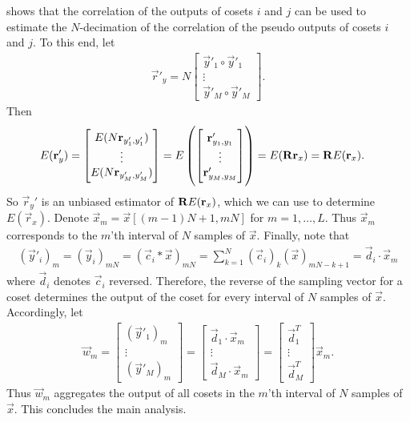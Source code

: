 \documentclass[a4paper, openany, oneside]{memoir}
\begin{document}
 shows that the correlation of the outputs of cosets $i$ and $j$ can be used to estimate the $N$-decimation of the correlation of the pseudo outputs of cosets $i$ and $j$. To this end, let
\begin{align*}
    \vec{r}'_y = N \begin{bmatrix}
        \vec{y}'_1 \circ \vec{y}'_1 \\
        \vdots \\
        \vec{y}'_M \circ \vec{y}'_M
    \end{bmatrix}.
\end{align*}
Then
\begin{align*}
    E(\boldsymbol{\mathbf{r}}'_y) &= \begin{bmatrix}
        E(N\boldsymbol{\mathbf{r}}_{y'_1,y'_1}) \\
        \vdots \\
        E(N\boldsymbol{\mathbf{r}}_{y'_M,y'_M})
    \end{bmatrix}
    = E\left(\begin{bmatrix}
        \boldsymbol{\mathbf{r}}'_{y_1,y_1} \\
        \vdots \\
        \boldsymbol{\mathbf{r}}'_{y_M,y_M} \\
    \end{bmatrix}\right) = E(\boldsymbol{\mathbf{R}} \boldsymbol{\mathbf{r}}_x) = \boldsymbol{\mathbf{R}} E(\boldsymbol{\mathbf{r}}_x).
\end{align*}
So $\vec{r}_y'$ is an unbiased estimator of $\boldsymbol{\mathbf{R}} E(\boldsymbol{\mathbf{r}}_x)$, which we can use to determine $E(\vec{r}_x)$. Denote $\vec{x}_m = \vec{x}[(m-1)N+1,mN]$ for $m = 1,\ldots,L$. Thus $\vec{x}_m$ corresponds to the $m$'th interval of $N$ samples of $\vec{x}$. Finally, note that
\begin{align*}
    (\vec{y}'_i)_m = (\vec{y}_i)_{mN} = (\vec{c}_i \ast \vec{x})_{mN} = \sum_{k=1}^N (\vec{c}_i)_k (\vec{x})_{mN - k + 1} = \vec{d}_i \cdot \vec{x}_m
\end{align*}
where $\vec{d}_i$ denotes $\vec{c}_i$ reversed. Therefore, the reverse of the sampling vector for a coset determines the output of the coset for every interval of $N$ samples of $\vec{x}$. Accordingly, let
\begin{align*}
    \vec{w}_m = \begin{bmatrix}
        (\vec{y}'_1)_m \\
        \vdots \\
        (\vec{y}'_M)_m
    \end{bmatrix} = \begin{bmatrix}
        \vec{d}_1 \cdot \vec{x}_m \\
        \vdots \\
        \vec{d}_M \cdot \vec{x}_m
    \end{bmatrix} = \begin{bmatrix}
        \vec{d}_1^T\\
        \vdots \\
        \vec{d}_M^T
    \end{bmatrix} \vec{x}_m.
\end{align*}
Thus $\vec{w}_m$ aggregates the output of all cosets in the $m$'th interval of $N$ samples of $\vec{x}$. This concludes the main analysis.
\end{document}
